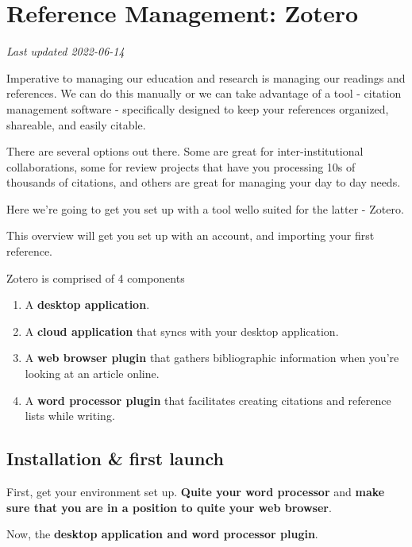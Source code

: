 \documentclass[
]{book}
\providecommand{\tightlist}{%
  \setlength{\itemsep}{0pt}\setlength{\parskip}{0pt}}
\begin{document}
\hypertarget{reference-management-zotero}{%
\chapter{Reference Management: Zotero}\label{reference-management-zotero}}

\emph{Last updated 2022-06-14}

Imperative to managing our education and research is managing our readings and references. We can do this manually or we can take advantage of a tool - citation management software - specifically designed to keep your references organized, shareable, and easily citable.

There are several options out there. Some are great for inter-institutional collaborations, some for review projects that have you processing 10s of thousands of citations, and others are great for managing your day to day needs.

Here we're going to get you set up with a tool wello suited for the latter - Zotero.

This overview will get you set up with an account, and importing your first reference.

Zotero is comprised of 4 components

\begin{enumerate}
\def\labelenumi{\arabic{enumi}.}
\tightlist
\item
  A \textbf{desktop application}.
\item
  A \textbf{cloud application} that syncs with your desktop application.
\item
  A \textbf{web browser plugin} that gathers bibliographic information when you're looking at an article online.
\item
  A \textbf{word processor plugin} that facilitates creating citations and reference lists while writing.
\end{enumerate}

\hypertarget{installation-first-launch}{%
\section{Installation \& first launch}\label{installation-first-launch}}

First, get your environment set up. \textbf{Quite your word processor} and \textbf{make sure that you are in a position to quite your web browser}.

Now, the \textbf{desktop application and word processor plugin}.
\end{document}
